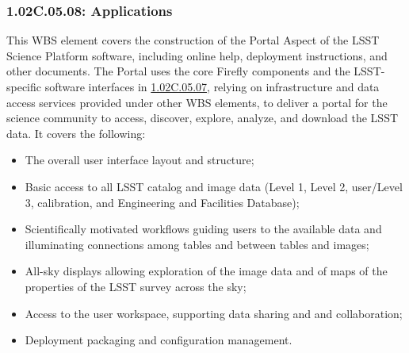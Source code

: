 \subsubsection*{1.02C.05.08: Applications}
\label{wbs:1.02C.05.08}

This WBS element covers the construction of the Portal Aspect of the LSST Science Platform software, including online help, deployment instructions, and other documents. The Portal uses the core Firefly components and the LSST-specific software interfaces in \hyperref[wbs:1.02C.05.07]{1.02C.05.07}, relying on infrastructure and data access services provided under other WBS elements, to deliver a portal for the science community to access, discover, explore, analyze, and download the LSST data. It covers the following:
\begin{itemize}

\item{The overall user interface layout and structure;}
\item{Basic access to all LSST catalog and image data (Level 1, Level 2, user/Level 3, calibration, and Engineering and Facilities Database);}
\item{Scientifically motivated workflows guiding users to the available data and illuminating connections among tables and between tables and images;}
\item{All-sky displays allowing exploration of the image data and of maps of the properties of the LSST survey across the sky;}
\item{Access to the user workspace, supporting data sharing and and collaboration;}
\item{Deployment packaging and configuration management.}

\end{itemize}

